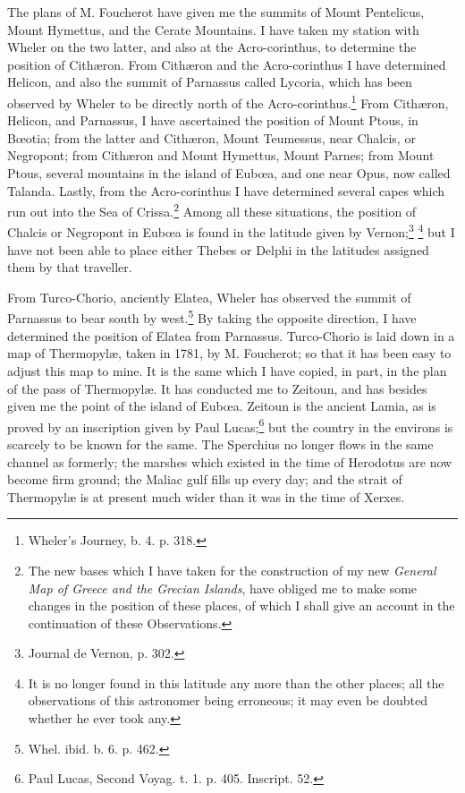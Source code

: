 \documentclass[a4paper, 11pt, oneside, polutonikogreek, english]{article}
\begin{document}
The plans of M. Foucherot have given me the summits of Mount Pentelicus, Mount Hymettus, and the Cerate Mountains. I have taken my station with Wheler on the two latter, and also at the Acro-corinthus, to determine the position of Cithæron. From Cithæron and the Acro-corinthus I have determined Helicon, and also the summit of Parnassus called Lycoria, which has been observed by Wheler to be directly north of the Acro-corinthus.\footnote{Wheler's Journey, b. 4. p. 318.} From Cithæron, Helicon, and Parnassus, I have ascertained the position of Mount Ptous, in Bœotia; from the latter and Cithæron, Mount Teumessus, near Chalcis, or Negropont; from Cithæron and Mount Hymettus, Mount Parnes; from Mount Ptous, several mountains in the island of Eubœa, and one near Opus, now called Talanda. Lastly, from the Acro-corinthus I have determined several capes which run out into the Sea of Crissa.\footnote{The new bases which I have taken for the construction of my new \emph{General Map of Greece and the Grecian Islands}, have obliged me to make some changes in the position of these places, of which I shall give an account in the continuation of these Observations.} Among all these situations, the position of Chalcis or Negropont in Eubœa is found in the latitude given by Vernon;\footnote{Journal de Vernon, p. 302.} \footnote{It is no longer found in this latitude any more than the other places; all the observations of this astronomer being erroneous; it may even be doubted whether he ever took any.} but I have not been able to place either Thebes or Delphi in the latitudes assigned them by that traveller.

From Turco-Chorio, anciently Elatea, Wheler has observed the summit of Parnassus to bear south by west.\footnote{Whel. ibid. b. 6. p. 462.} By taking the opposite direction, I have determined the position of Elatea from Parnassus. Turco-Chorio is laid down in a map of Thermopylæ, taken in 1781, by M. Foucherot; so that it has been easy to adjust this map to mine. It is the same which I have copied, in part, in the plan of the pass of Thermopylæ. It has conducted me to Zeitoun, and has besides given me the point of the island of Eubœa. Zeitoun is the ancient Lamia, as is proved by an inscription given by Paul Lucas;\footnote{Paul Lucas, Second Voyag. t. 1. p. 405. Inscript. 52.} but the country in the environs is scarcely to be known for the same. The Sperchius no longer flows in the same channel as formerly; the marshes which existed in the time of Herodotus are now become firm ground; the Maliac gulf fills up every day; and the strait of Thermopylæ is at present much wider than it was in the time of Xerxes.
\end{document}
